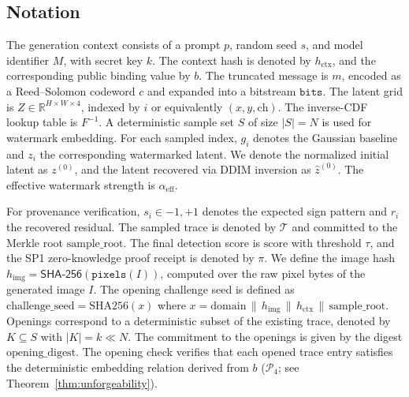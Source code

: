 \documentclass{article}
\theoremstyle{plain}
\theoremstyle{definition}
\theoremstyle{remark}
\begin{document}
\subsection{Notation}
The generation context consists of a prompt $p$, random seed $s$, and model identifier $M$, with secret key $k$. The context hash is denoted by $h_{\mathrm{ctx}}$, and the corresponding public binding value by $b$. The truncated message is $m$, encoded as a Reed–Solomon codeword $c$ and expanded into a bitstream $\mathtt{bits}$. The latent grid is $Z \in \mathbb{R}^{H \times W \times 4}$, indexed by $i$ or equivalently $(x,y,\mathrm{ch})$. The inverse-CDF lookup table is $F^{-1}$. A deterministic sample set $S$ of size $|S|=N$ is used for watermark embedding. For each sampled index, $g_i$ denotes the Gaussian baseline and $z_i$ the corresponding watermarked latent. We denote the normalized initial latent as $z^{(0)}$, and the latent recovered via DDIM inversion as $\hat{z}^{(0)}$. The effective watermark strength is $\alpha_{\mathrm{eff}}$.

For provenance verification, $s_i \in {-1,+1}$ denotes the expected sign pattern and $r_i$ the recovered residual. The sampled trace is denoted by $\mathcal{T}$ and committed to the Merkle root $\mathrm{sample\_root}$. The final detection score is $\mathrm{score}$ with threshold $\tau$, and the SP1 zero-knowledge proof receipt is denoted by $\pi$. We define the image hash $h_{\mathrm{img}} = \mathsf{SHA\text{-}256}(\mathtt{pixels}(I))$, computed over the raw pixel bytes of the generated image $I$. The opening challenge seed is defined as
$\mathrm{challenge\_seed} = \mathrm{SHA256}(x)$ where $x = \mathrm{domain} \,\|\, h_{\mathrm{img}} \,\|\, h_{\mathrm{ctx}} \,\|\, \mathrm{sample\_root}$. Openings correspond to a deterministic subset of the existing trace, denoted by $K \subseteq S$ with $|K| = k \ll N$. The commitment to the openings is given by the digest $\mathrm{opening\_digest}$. The opening check verifies that each opened trace entry satisfies the deterministic embedding relation derived from $b$ ($\mathcal{P}_4$; see Theorem~\ref{thm:unforgeability}).
\end{document}
